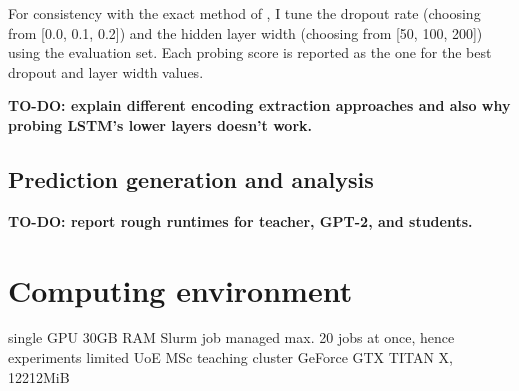 \documentclass[bsc,frontabs,twoside,singlespacing,parskip,deptreport]{infthesis}
\begin{document}
{{{      For consistency with the exact method of \citeauthor{Conneau_2018}, I tune the dropout rate (choosing from [0.0, 0.1, 0.2]) and the hidden layer width (choosing from [50, 100, 200]) using the evaluation set. Each probing score is reported as the one for the best dropout and layer width values.

      \textbf{TO-DO: explain different encoding extraction approaches and also why probing LSTM's lower layers doesn't work.}
    }

    \subsection{Prediction generation and analysis}{

    }

    \textbf{TO-DO: report rough runtimes for teacher, GPT-2, and students.}
  }

  \section{Computing environment}{
    single GPU
    30GB RAM
    Slurm job managed
    max. 20 jobs at once, hence experiments limited
    UoE MSc teaching cluster
    GeForce GTX TITAN X, 12212MiB    
  }
}
\end{document}
